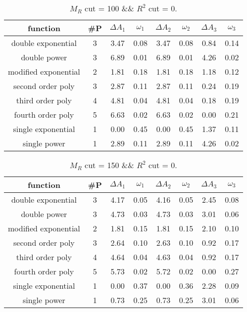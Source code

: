  
\begin{table}[H] 
\begin{center} 
\begin{tabular}{|c|c|cc|cc|cc|} 
\hline function & \#P & $\Delta A_1$ & $\omega_1$ & $\Delta A_2$ & $\omega_2$ & $\Delta A_3$ & $\omega_3$ \\ \hline 
double exponential &  3 &   3.47 &   0.08 &   3.47 &   0.08 &   0.84 &   0.14 \\ 
double power &  3 &   6.89 &   0.01 &   6.89 &   0.01 &   4.26 &   0.02 \\ 
modified exponential &  2 &   1.81 &   0.18 &   1.81 &   0.18 &   1.18 &   0.12 \\ 
second order poly &  3 &   2.87 &   0.11 &   2.87 &   0.11 &   0.24 &   0.19 \\ 
third order poly &  4 &   4.81 &   0.04 &   4.81 &   0.04 &   0.18 &   0.19 \\ 
fourth order poly &  5 &   6.63 &   0.02 &   6.63 &   0.02 &   0.00 &   0.21 \\ 
single exponential &  1 &   0.00 &   0.45 &   0.00 &   0.45 &   1.37 &   0.11 \\ 
single power &  1 &   2.89 &   0.11 &   2.89 &   0.11 &   4.26 &   0.02 \\ 
\hline 
\end{tabular} 
\caption{$M_R$ cut = 100 \&\& $R^2$ cut = 0.} 
\label{tab:FitChoices_100_0} 
\end{center} 
\end{table} 
 
 
\begin{table}[H] 
\begin{center} 
\begin{tabular}{|c|c|cc|cc|cc|} 
\hline function & \#P & $\Delta A_1$ & $\omega_1$ & $\Delta A_2$ & $\omega_2$ & $\Delta A_3$ & $\omega_3$ \\ \hline 
double exponential &  3 &   4.17 &   0.05 &   4.16 &   0.05 &   2.45 &   0.08 \\ 
double power &  3 &   4.73 &   0.03 &   4.73 &   0.03 &   3.01 &   0.06 \\ 
modified exponential &  2 &   1.81 &   0.15 &   1.81 &   0.15 &   2.10 &   0.10 \\ 
second order poly &  3 &   2.64 &   0.10 &   2.63 &   0.10 &   0.92 &   0.17 \\ 
third order poly &  4 &   4.64 &   0.04 &   4.63 &   0.04 &   0.92 &   0.17 \\ 
fourth order poly &  5 &   5.73 &   0.02 &   5.72 &   0.02 &   0.00 &   0.27 \\ 
single exponential &  1 &   0.00 &   0.37 &   0.00 &   0.36 &   2.28 &   0.09 \\ 
single power &  1 &   0.73 &   0.25 &   0.73 &   0.25 &   3.01 &   0.06 \\ 
\hline 
\end{tabular} 
\caption{$M_R$ cut = 150 \&\& $R^2$ cut = 0.} 
\label{tab:FitChoices_150_0} 
\end{center} 
\end{table} 
 
